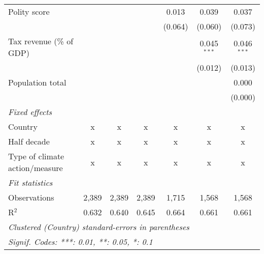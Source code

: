\begin{tabular}{lcccccc}
   Polity score                                                           &         &                &                & 0.013          & 0.039          & 0.037\\   
                                                                          &         &                &                & (0.064)        & (0.060)        & (0.073)\\   
   Tax revenue (\% of GDP)                                                &         &                &                &                & 0.045$^{***}$  & 0.046$^{***}$\\   
                                                                          &         &                &                &                & (0.012)        & (0.013)\\   
   Population total                                                       &         &                &                &                &                & 0.000\\   
                                                                          &         &                &                &                &                & (0.000)\\   
   \emph{Fixed effects}\\
   Country                                                                & x       & x              & x              & x              & x              & x\\  
   Half decade                                                            & x       & x              & x              & x              & x              & x\\  
   Type of climate action/measure                                         & x       & x              & x              & x              & x              & x\\  
   \midrule \emph{Fit statistics}\\
   Observations                                                           & 2,389   & 2,389          & 2,389          & 1,715          & 1,568          & 1,568\\  
   R$^2$                                                                  & 0.632   & 0.640          & 0.645          & 0.664          & 0.661          & 0.661\\  
   \midrule
   \multicolumn{7}{l}{\emph{Clustered (Country) standard-errors in parentheses}}\\
   \multicolumn{7}{l}{\emph{Signif. Codes: ***: 0.01, **: 0.05, *: 0.1}}\\
\end{tabular}
\par\endgroup


